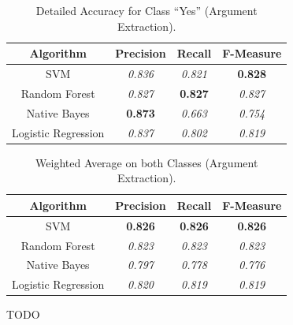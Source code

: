 \begin{table}[H]
\centering
\caption{Detailed Accuracy for Class “Yes” (Argument Extraction).}
\label{42_table_ref}
\begin{tabular}{cccc}
\hline
{\bf Algorithm}     & {\bf Precision} & {\bf Recall}    & {\bf F-Measure} \\ \hline
SVM                 & {\it 0.836}     & {\it 0.821}     & {\bf 0.828} \\
Random Forest       & {\it 0.827}     & {\bf 0.827}	   & {\it 0.827}     \\
Native Bayes        & {\bf 0.873} 	 & {\it 0.663}     & {\it 0.754}     \\
Logistic Regression & {\it 0.837}     & {\it 0.802}     & {\it 0.819}     \\ \hline
\end{tabular}
\end{table}

\begin{table}[H]
\centering
\caption{Weighted Average on both Classes (Argument Extraction).}
\label{43_table_ref}
\begin{tabular}{cccc}
\hline
{\bf Algorithm}     & {\bf Precision} & {\bf Recall}    & {\bf F-Measure} \\ \hline
SVM                 & {\bf 0.826} 	 & {\bf 0.826}     & {\bf 0.826} \\
Random Forest       & {\it 0.823}     & {\it 0.823}     & {\it 0.823}     \\
Native Bayes        & {\it 0.797}     & {\it 0.778}     & {\it 0.776}     \\
Logistic Regression & {\it 0.820}     & {\it 0.819}     & {\it 0.819}     \\ \hline
\end{tabular}
\end{table}

TODO\\
\\

